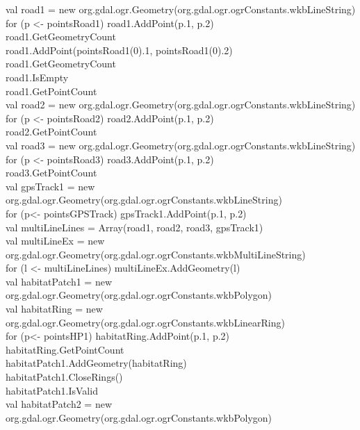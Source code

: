 \documentclass {article}
\begin{document}
val road1 = new org.gdal.ogr.Geometry(org.gdal.ogr.ogrConstants.wkbLineString)\\
for (p <- pointsRoad1) road1.AddPoint(p.\underline{\space}1, p.\underline{\space}2)\\
road1.GetGeometryCount\\
road1.AddPoint(pointsRoad1(0).\underline{\space}1, pointsRoad1(0).\underline{\space}2)\\
road1.GetGeometryCount\\
road1.IsEmpty\\
road1.GetPointCount\\
val road2 = new org.gdal.ogr.Geometry(org.gdal.ogr.ogrConstants.wkbLineString)\\
for (p <- pointsRoad2) road2.AddPoint(p.\underline{\space}1, p.\underline{\space}2)\\
road2.GetPointCount\\
val road3 = new org.gdal.ogr.Geometry(org.gdal.ogr.ogrConstants.wkbLineString)\\
for (p <- pointsRoad3) road3.AddPoint(p.\underline{\space}1, p.\underline{\space}2)\\
road3.GetPointCount\\
val gpsTrack1 = new org.gdal.ogr.Geometry(org.gdal.ogr.ogrConstants.wkbLineString) \\
for (p<- pointsGPSTrack) gpsTrack1.AddPoint(p.\underline{\space}1, p.\underline{\space}2)\\
val multiLineLines = Array(road1, road2, road3, gpsTrack1)\\
val multiLineEx = new org.gdal.ogr.Geometry(org.gdal.ogr.ogrConstants.wkbMultiLineString) \\
for (l <- multiLineLines) { multiLineEx.AddGeometry(l) } \\
val habitatPatch1 = new org.gdal.ogr.Geometry(org.gdal.ogr.ogrConstants.wkbPolygon)\\
val habitatRing = new org.gdal.ogr.Geometry(org.gdal.ogr.ogrConstants.wkbLinearRing)\\
for (p<- pointsHP1) habitatRing.AddPoint(p.\underline{\space}1, p.\underline{\space}2)\\
habitatRing.GetPointCount\\
habitatPatch1.AddGeometry(habitatRing)\\
habitatPatch1.CloseRings()\\
habitatPatch1.IsValid\\
val habitatPatch2 = new org.gdal.ogr.Geometry(org.gdal.ogr.ogrConstants.wkbPolygon)\\
\end{document}
